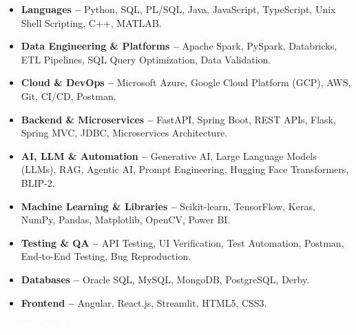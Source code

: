 \documentclass[10pt,a4paper]{article}
\newcommand{\resumesection}[1]{%
    \vspace{2pt}
    \noindent
    \colorbox{sectionblack}{%
        \parbox{\dimexpr\linewidth-2\fboxsep\relax}{%
            \centering
            \textcolor{white}{\textbf{\normalsize #1}}
        }%
    }%
    \vspace{1pt}
}
\begin{document}
\begin{itemize}

\item \textbf{Languages --} Python, SQL, PL/SQL, Java, JavaScript, TypeScript, Unix Shell Scripting, C++, MATLAB.

\item \textbf{Data Engineering \& Platforms --} Apache Spark, PySpark, Databricks, ETL Pipelines, SQL Query Optimization, Data Validation.

\item \textbf{Cloud \& DevOps --} Microsoft Azure, Google Cloud Platform (GCP), AWS, Git, CI/CD, Postman.

\item \textbf{Backend \& Microservices --} FastAPI, Spring Boot, REST APIs, Flask, Spring MVC, JDBC, Microservices Architecture.

\item \textbf{AI, LLM \& Automation --} Generative AI, Large Language Models (LLMs), RAG, Agentic AI, Prompt Engineering, Hugging Face Transformers, BLIP-2.

\item \textbf{Machine Learning \& Libraries --} Scikit-learn, TensorFlow, Keras, NumPy, Pandas, Matplotlib, OpenCV, Power BI.

\item \textbf{Testing \& QA --} API Testing, UI Verification, Test Automation, Postman, End-to-End Testing, Bug Reproduction.

\item \textbf{Databases --} Oracle SQL, MySQL, MongoDB, PostgreSQL, Derby.

\item \textbf{Frontend --} Angular, React.js, Streamlit, HTML5, CSS3.

\end{itemize}


\resumesection{CERTIFICATES}
\end{document}
